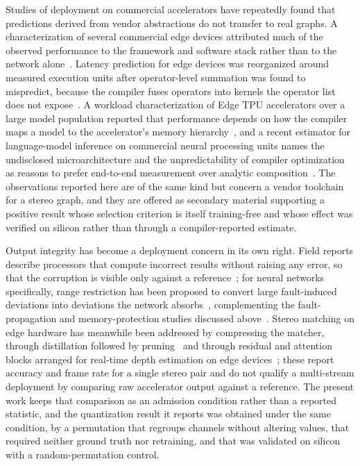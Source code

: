 Studies of deployment on commercial accelerators have repeatedly found that
predictions derived from vendor abstractions do not transfer to real graphs. A
characterization of several commercial edge devices attributed much of the
observed performance to the framework and software stack rather than to the
network alone~\cite{rbq_hadidi2019characterizing}. Latency prediction for edge
devices was reorganized around measured execution units after operator-level
summation was found to mispredict, because the compiler fuses operators into
kernels the operator list does not expose~\cite{rbq_zhang2021nnmeter}. A
workload characterization of Edge TPU accelerators over a large model
population reported that performance depends on how the compiler maps a model
to the accelerator's memory hierarchy~\cite{rbq_seshadri2022edgetpu}, and a
recent estimator for language-model inference on commercial neural processing
units names the undisclosed microarchitecture and the unpredictability of
compiler optimization as reasons to prefer end-to-end measurement over analytic
composition~\cite{rbq_park2026lens}. The observations reported here are of the
same kind but concern a vendor toolchain for a stereo graph, and they are
offered as secondary material supporting a positive result whose selection
criterion is itself training-free and whose effect was verified on silicon
rather than through a compiler-reported estimate.

Output integrity has become a deployment concern in its own right. Field
reports describe processors that compute incorrect results without raising any
error, so that the corruption is visible only against a
reference~\cite{rbq_hochschild2021cores}; for neural networks specifically,
range restriction has been proposed to convert large fault-induced deviations
into deviations the network absorbs~\cite{rbq_chen2021ranger}, complementing
the fault-propagation and memory-protection studies discussed
above~\cite{li2017dnnresilience, zheng2025save}. Stereo matching on edge
hardware has meanwhile been addressed by compressing the matcher, through
distillation followed by pruning~\cite{rbq_pan2024distillprune} and through
residual and attention blocks arranged for real-time depth estimation on edge
devices~\cite{rbq_liang2026rcaenet}; these report accuracy and frame rate for a
single stereo pair and do not qualify a multi-stream deployment by comparing
raw accelerator output against a reference. The present work keeps that
comparison as an admission condition rather than a reported statistic, and the
quantization result it reports was obtained under the same condition, by a
permutation that regroups channels without altering values, that required
neither ground truth nor retraining, and that was validated on silicon with a
random-permutation control.
